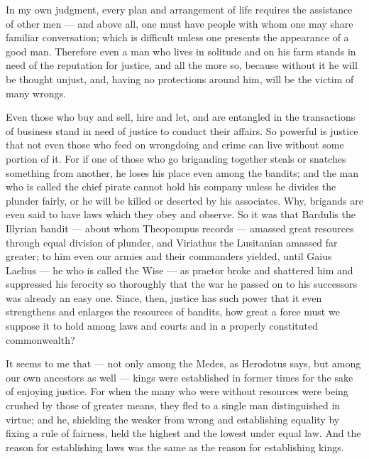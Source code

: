  In my own judgment, every plan and arrangement of life requires the assistance of other men — and above all, one must have people with whom one may share familiar conversation; which is difficult unless one presents the appearance of a good man. Therefore even a man who lives in solitude and on his farm stands in need of the reputation for justice, and all the more so, because without it he will be thought unjust, and, having no protections around him, will be the victim of many wrongs.

 Even those who buy and sell, hire and let, and are entangled in the transactions of business stand in need of justice to conduct their affairs. So powerful is justice that not even those who feed on wrongdoing and crime can live without some portion of it. For if one of those who go briganding together steals or snatches something from another, he loses his place even among the bandits; and the man who is called the chief pirate cannot hold his company unless he divides the plunder fairly, or he will be killed or deserted by his associates. Why, brigands are even said to have laws which they obey and observe. So it was that Bardulis the Illyrian bandit — about whom Theopompus records — amassed great resources through equal division of plunder, and Viriathus the Lusitanian amassed far greater; to him even our armies and their commanders yielded, until Gaius Laelius — he who is called the Wise — as praetor broke and shattered him and suppressed his ferocity so thoroughly that the war he passed on to his successors was already an easy one. Since, then, justice has such power that it even strengthens and enlarges the resources of bandits, how great a force must we suppose it to hold among laws and courts and in a properly constituted commonwealth?

 It seems to me that — not only among the Medes, as Herodotus says, but among our own ancestors as well — kings were established in former times for the sake of enjoying justice. For when the many who were without resources were being crushed by those of greater means, they fled to a single man distinguished in virtue; and he, shielding the weaker from wrong and establishing equality by fixing a rule of fairness, held the highest and the lowest under equal law. And the reason for establishing laws was the same as the reason for establishing kings.

